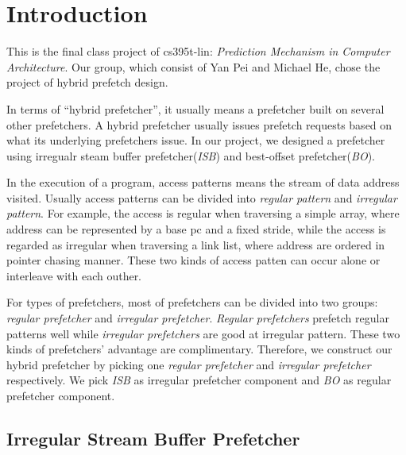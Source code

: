 \section{Introduction}
\label{sec:intro}

This is the final class project of cs395t-lin: \emph{Prediction Mechanism in Computer Architecture}. Our group, which consist of Yan Pei and Michael He, chose the project of hybrid prefetch design.

In terms of ``hybrid prefetcher'', it usually means a prefetcher built on several other prefetchers. A hybrid prefetcher usually issues prefetch requests based on what its underlying prefetchers issue. In our project, we designed a prefetcher using irregualr steam buffer prefetcher(\emph{ISB})\cite{isbpaper} and best-offset prefetcher(\emph{BO})\cite{bopaper}.

In the execution of a program, access patterns means the stream of data address visited. Usually access patterns can be divided into \emph{regular pattern} and \emph{irregular pattern}. For example, the access is regular when traversing a simple array, where address can be represented by a base pc and a fixed stride, while the access is regarded as irregular when traversing a link list, where address are ordered in pointer chasing manner. These two kinds of access patten can occur alone or interleave with each outher.

For types of prefetchers, most of prefetchers can be divided into two groups: \emph{regular prefetcher}\cite{bopaper, sandboxpaper} and \emph{irregular prefetcher}\cite{isbpaper, ghbpaper, reinforcementlearning}. \emph{Regular prefetchers} prefetch regular patterns well while \emph{irregular prefetchers} are good at irregular pattern. These two kinds of prefetchers' advantage are complimentary. Therefore, we construct our hybrid prefetcher by picking one \emph{regular prefetcher} and \emph{irregular prefetcher} respectively. We pick \emph{ISB}\cite{isbpaper} as irregular prefetcher component and \emph{BO}\cite{bopaper} as regular prefetcher component.

  \subsection{Irregular Stream Buffer Prefetcher}
  \label{sec:isbintro}

